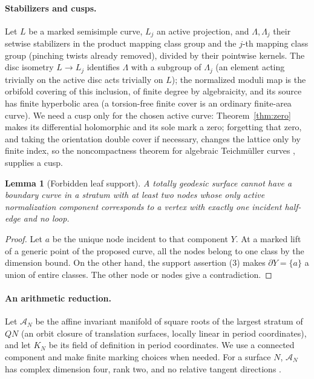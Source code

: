\documentclass[11pt]{article}
\newtheorem{lemma}[theorem]{Lemma}
\theoremstyle{remark}
\begin{document}
\paragraph{Stabilizers and cusps.}
Let \(L\) be a marked semisimple curve, \(L_j\) an active
projection, and \(\Lambda,\Lambda_j\) their setwise stabilizers in
the product mapping class group and the \(j\)-th mapping class group
(pinching twists already removed), divided by their pointwise
kernels. The disc isometry \(L\to L_j\) identifies \(\Lambda\) with
a subgroup of \(\Lambda_j\) (an element acting trivially on the
active disc acts trivially on \(L\)); the normalized moduli map is
the orbifold covering of this inclusion, of finite degree by
algebraicity, and its source has finite hyperbolic area (a
torsion-free finite cover is an ordinary finite-area curve).
We need a cusp only for the chosen active curve:
Theorem~\ref{thm:zero} makes its differential holomorphic and its
sole mark a zero; forgetting that zero, and taking the orientation
double cover if necessary, changes the lattice only by finite index,
so the noncompactness theorem for algebraic Teichm\"uller curves
\cite{Veech}, \cite[Proposition 2.4]{McMullenSurvey} supplies a cusp.

\begin{lemma}[Forbidden leaf support]\label{lem:forbidden}
A totally geodesic surface cannot have a boundary curve in a stratum
with at least two nodes whose only active normalization component
corresponds to a vertex with exactly one incident half-edge and no
loop.
\end{lemma}

\begin{proof}
Let \(a\) be the unique node incident to that component \(Y\).
At a marked lift of a generic point of the proposed curve, all the
nodes belong to one class by the dimension bound. On the other
hand, the support assertion (3) makes \(\partial Y=\{a\}\) a union of
entire classes. The other node or nodes give a contradiction.
\end{proof}

\paragraph{An arithmetic reduction.}
Let \(\mathcal A_N\) be the affine invariant manifold of square roots
of the largest stratum of \(QN\) (an orbit closure of translation
surfaces, locally linear in period coordinates), and let \(K_N\) be
its field of definition in period coordinates. We use a connected
component and make finite marking choices when needed. For a surface
\(N\), \(\mathcal A_N\) has complex dimension four, rank two, and no
relative tangent directions \cite[Theorem 1.3 and its proof]{WrightTG}.
\end{document}

